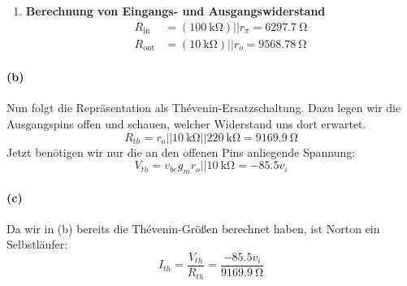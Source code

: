 \documentclass[11pt,a4paper,titlepage]{article}
\begin{document}
\begin{enumerate}
	\item \textbf{Berechnung von Eingangs- und Ausgangswiderstand}
	\begin{equation}
	\begin{aligned}
	  R_{\text{in}} &= (\SI{100}{\kilo\ohm})||r_{\pi} = \SI{6297.7}{\ohm}\\
	  R_{\text{out}} &= (\SI{10}{\kilo\ohm})||r_o = \SI{9568.78}{\ohm}
	\end{aligned}
	\end{equation}
\end{enumerate}

\paragraph{(b)} Nun folgt die Repräsentation als Thévenin-Ersatzschaltung. Dazu legen wir die Ausgangspins offen und schauen, welcher Widerstand uns dort erwartet.
\[ R_{th} = r_o||\SI{10}{\kilo\ohm}||\SI{220}{\kilo\ohm} = \SI{9169.9}{\ohm} \]
Jetzt benötigen wir nur die an den offenen Pins anliegende Spannung:
\[ V_{th} = v_{be}g_mr_o||\SI{10}{\kilo\ohm} = -85.5v_i \]

\paragraph{(c)} Da wir in (b) bereits die Thévenin-Größen berechnet haben, ist Norton ein Selbstläufer:
\[ I_{th} = \frac{V_{th}}{R_{th}} = \frac{-85.5v_i}{\SI{9169.9}{\ohm}} \]
\end{document}
